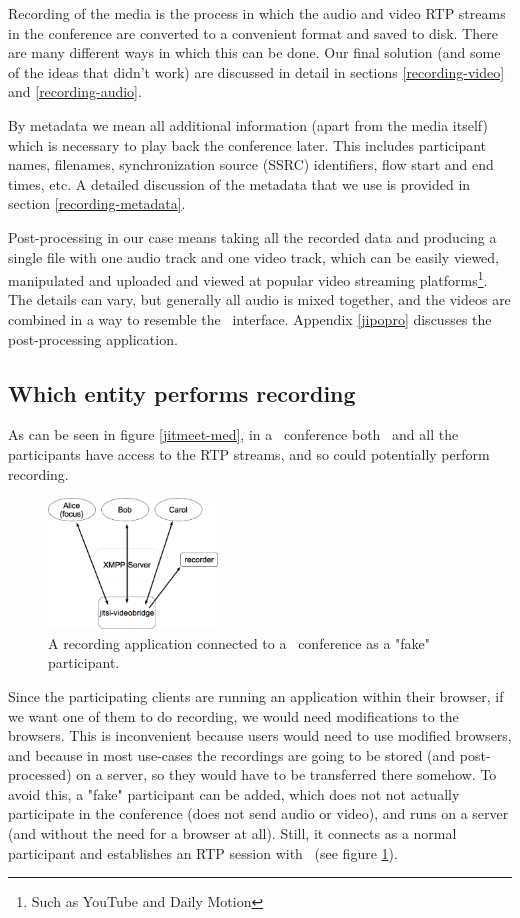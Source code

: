 \documentclass[twoside,openright,a4paper,12pt,english]{article}
\begin{document}
Recording of the media is the process in which the audio and video RTP streams
in the conference are converted to a convenient format and saved to disk. There
are many different ways in which this can be done. Our final solution (and some
of the ideas that didn't work) are discussed in detail in
sections \ref{recording-video} and \ref{recording-audio}.

By metadata we mean all additional information (apart from the media
itself) which is necessary to play back the conference later. This includes participant names,
filenames, synchronization source (SSRC) identifiers, flow start and end times, etc.
A detailed discussion of the
metadata that we use is provided in section \ref{recording-metadata}.

Post-processing in our case means taking all the recorded data and producing a
single file with one audio track and one video track, which can be easily
viewed, manipulated and uploaded and viewed at popular video streaming
platforms\footnote{Such as YouTube and Daily Motion}.
The details can vary, but 
generally all audio is mixed together, and the videos are combined in a way to
resemble the \jm\ interface. Appendix \ref{jipopro} discusses the
post-processing application.


\subsection{Which entity performs recording}
As can be seen in figure \ref{jitmeet-med}, in a \jm\ conference both \jvb\ and
all the participants have access to the RTP streams, and so could potentially
perform recording.

\begin{figure}
   \centering
        \includegraphics[width=0.4\textwidth]{./pics/jm-rec.eps}
        \caption{A recording application connected to a \jm\ conference as a "fake" participant.}
   \label{jitmeet-rec}
\end{figure}

Since the participating clients are running an application within their
browser, if we want one of them to do recording, we would need modifications to
the browsers. This is inconvenient because users would need to use modified
browsers, and because in most use-cases the recordings are going to be stored
(and post-processed) on a server, so they would have to be transferred there
somehow.  To avoid this, a "fake" participant can
be added, which does not not actually participate in the conference
(does not send audio or video), and runs on a server (and without the need for a browser at all). Still, it
connects as a normal participant and establishes an RTP session with \jvb\ (see
figure \ref{jitmeet-rec}).
\end{document}
